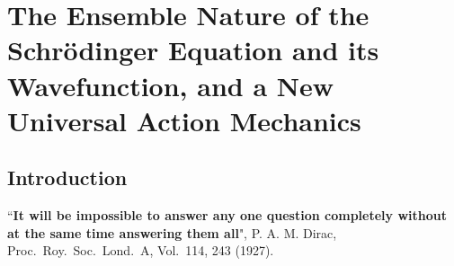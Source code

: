 \chapter[The Ensemble Nature of the Schr\"{o}dinger Equation...]{The Ensemble Nature of the Schr\"{o}dinger Equation and its Wavefunction, and a New Universal Action Mechanics}\label{chap14}



\begin{abstract}
All researchers of quantum mechanics assume that the\break Schr\"{o}dinger equation is the equation for
dynamics, akin to Newton's equation of motion or the Hamilton-Jacobi equation for the evolution
of action. The wavefunction $\psi(x)$ is assumed to be some way associated with a single particle,
or a single quantum history. Hence, Born's ad hoc interpretation is necessary to connect the psi-function to the statistical results of an ensemble of observations. Here I show that the Schr\"{o}dinger
equation is not the equation for dynamics, but it is in fact the equation for the evolution of
the ensemble probability density $\rho(x)$, written in terms of the single valued square root $\psi(x,t)$
of the probability density, \textit{with the constraint that $\rho(x)$ is that of a dynamical system}. It then
follows that the Born's rule is an exact relation $\psi \psi^{\ast} \equiv \rho$, by definition. This implies that a
matter-wave is absent in quantum mechanics; $\psi(x,t)$ is not the matter-wave. Neither is it the
representative of a single quantum history. The psi-function is an ensemble averaged quantity.
The true dynamical equation is a modified Hamilton's equation for the action-wave $\zeta(S)$. This
completes the Hamiltonian dynamics to a universal dynamics, with the encompassing uncertainty
relation $\Delta S \geq \hbar$. These findings define the kernel of quantum dynamics without any of the
foundational problems of interpretation or ontology, while retaining all the statistical results of
quantum mechanics.
\end{abstract}

\section{Introduction}\label{c14-sec1}

``\textbf{It will be impossible to answer any one question completely without at the
same time answering them all}", P. A. M. Dirac, Proc.\ Roy.\ Soc.\ Lond.\ A, Vol.\ 114,
243 (1927).

